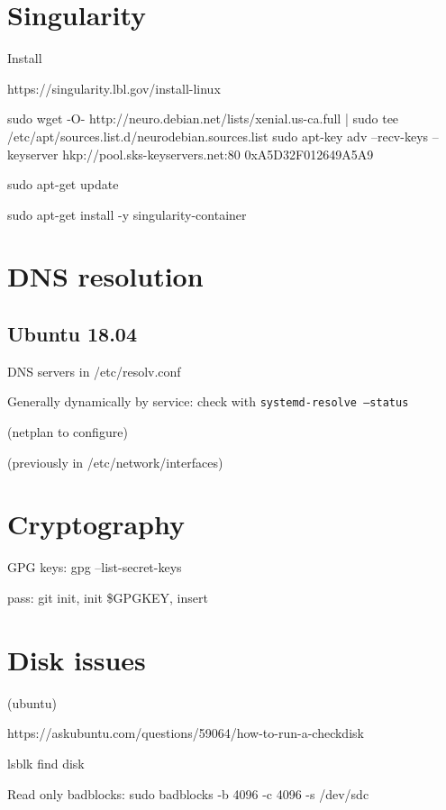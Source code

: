 \section*{Singularity}

Install

https://singularity.lbl.gov/install-linux

sudo wget -O- http://neuro.debian.net/lists/xenial.us-ca.full | sudo tee /etc/apt/sources.list.d/neurodebian.sources.list
sudo apt-key adv --recv-keys --keyserver hkp://pool.sks-keyservers.net:80 0xA5D32F012649A5A9

sudo apt-get update

sudo apt-get install -y singularity-container



\section*{DNS resolution}

\subsection*{Ubuntu 18.04}

DNS servers in /etc/resolv.conf

Generally dynamically by service: check with \texttt{systemd-resolve --status}

(netplan to configure) 

(previously in /etc/network/interfaces)


\section*{Cryptography}

GPG keys: gpg --list-secret-keys

pass: git init, init \$GPGKEY, insert



\section*{Disk issues}

(ubuntu)

https://askubuntu.com/questions/59064/how-to-run-a-checkdisk

lsblk find disk

Read only badblocks:
sudo badblocks -b 4096 -c 4096 -s /dev/sdc











